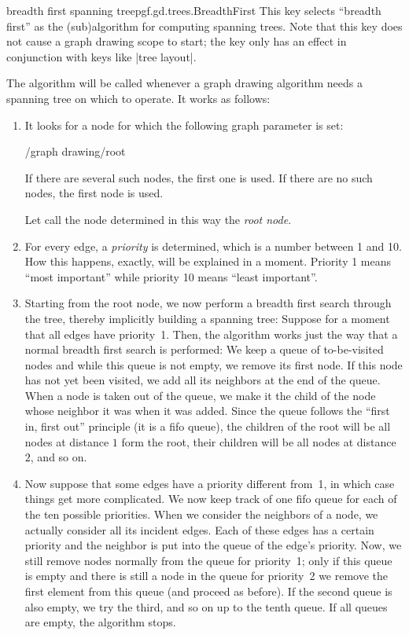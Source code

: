 \begin{gdalgorithm}{breadth first spanning tree}{pgf.gd.trees.BreadthFirst}
  This key selects ``breadth first'' as the (sub)algorithm for
  computing spanning trees. Note that this key does not cause a graph
  drawing scope to start; the key only has an effect in conjunction
  with keys like |tree layout|.

  The algorithm will be called whenever a graph drawing algorithm
  needs a spanning tree on which to operate. It works as follows:
  
  \begin{enumerate}
  \item It looks for a node for which the following graph parameter is
    set:
    \begin{key}{/graph drawing/root}
    \end{key}
    If there are several such nodes, the first one is used. If there
    are no such nodes, the first node is used.

    Let call the node determined in this way the \emph{root node}.
  \item For every edge, a \emph{priority} is determined, which is a
    number between 1 and 10. How this happens, exactly, will be
    explained in a moment. Priority 1 means ``most important'' while
    priority 10 means ``least important''.
  \item Starting from the root node, we now perform a breadth first
    search through the tree, thereby implicitly building a spanning
    tree: Suppose for a moment that all edges have priority~1. Then,
    the algorithm works just the way that a normal breadth first
    search is performed: We keep a queue of to-be-visited nodes and
    while this queue is not empty, we remove its first node. If this
    node has not yet been visited, we add all its neighbors at the
    end of the queue. When a node is taken out of the queue, we make
    it the child of the node whose neighbor it was when it was
    added. Since the queue follows the ``first in, first out''
    principle (it is a fifo queue), the children of the root will be
    all nodes at distance $1$ form the root, their children will be
    all nodes at distance $2$, and so on. 
  \item Now suppose that some edges have a priority different
    from~1, in which case things get more complicated. We now keep
    track of one fifo queue for each of the ten possible
    priorities. When we consider the neighbors of a node, we actually
    consider all its incident edges. Each of these edges has a certain
    priority and the neighbor is put into the queue of the edge's
    priority. Now, we still remove nodes normally from the queue for
    priority~1; only if this queue is empty and there is still a node
    in the queue for priority~2 we remove the first element from this
    queue (and proceed as before). If the second queue is also empty,
    we try the third, and so on up to the tenth queue. If all queues
    are empty, the algorithm stops.
  \end{enumerate}


\end{gdalgorithm}
